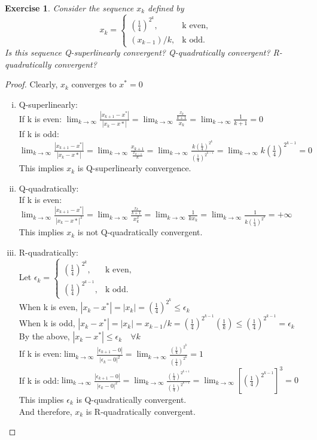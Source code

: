 \documentclass[11pt,a4paper]{article}
\renewcommand{\(}{\left(}
\renewcommand{\)}{\right)}
\newtheorem{exercise}{Exercise}
\begin{document}
  \setcounter{exercise}{15}
  
  \begin{exercise}
  Consider the sequence ${x_k}$ defined by
\[ x_k = \left\{
\begin{array}{ll}
\left( \frac{1}{4} \right)^{2^k}, & \mbox{k even}, \\
(x_{k-1})/k, & \mbox{k odd}.
\end{array} \right. \]
Is this sequence Q-superlinearly convergent? Q-quadratically convergent? R-quadratically convergent?	
  \end{exercise}  
  \begin{proof}
  Clearly, $x_k$ converges to $x^* = 0$
\begin{enumerate}[(i)]
\item Q-superlinearly:\\
If k is even: $\displaystyle \lim_{k \to \infty} \frac{|x_{k+1}-x^*|}{|x_k-x*|}=\lim_{k \to \infty} \frac{\frac{x_k}{k+1}}{x_k}=\lim_{k \to \infty} \frac{1}{k+1}=0$\\
If k is odd:$\displaystyle \lim_{k \to \infty} \frac{|x_{k+1}-x^*|}{|x_k-x*|}=\lim_{k \to \infty} \frac{x_{k+1}}{\frac{x_{k-1}}{k}}=\lim_{k \to \infty} \frac{k(\frac{1}{4})^{2^k}}{(\frac{1}{4})^{2^{k-1}}}=\lim_{k \to \infty} k(\frac{1}{4})^{2^{k-1}}=0$\\
This implies $x_k$ is Q-superlinearly convergence.
\item Q-quadratically:\\
If k is even:$\displaystyle \lim_{k \to \infty} \frac{|x_{k+1}-x^*|}{|x_k-x*|^2}=\lim_{k \to \infty} \frac{\frac{x_k}{k+1}}{x_k^2}=\lim_{k \to \infty} \frac{1}{kx_k}=\lim_{k \to \infty} \frac{1}{k(\frac{1}{4})^{2^k}}=+\infty$
This implies $x_k$ is not Q-quadratically convergent.
\item R-quadratically:\\
Let $\epsilon_k = \left\{
\begin{array}{ll}
\left( \frac{1}{4} \right)^{2^k}, & \mbox{k even}, \\
\left( \frac{1}{4} \right)^{2^{k-1}}, & \mbox{k odd}.
\end{array} \right.$\\
When k is even, $|x_k-x^*|=|x_k|=(\frac{1}{4})^{2^k} \leq \epsilon_k$\\
When k is odd, $|x_k-x^*|=|x_k|=x_{k-1}/k=(\frac{1}{4})^{2^{k-1}}(\frac{1}{k}) \leq (\frac{1}{4})^{2^{k-1}}=\epsilon_k$\\
By the above, $|x_k-x^*| \leq \epsilon_k \quad \forall k$\\
If k is even:$\displaystyle \lim_{k \to \infty} \frac{|\epsilon_{k+1}-0|}{|\epsilon_k-0|^2}=\lim_{k \to \infty} \frac{(\frac{1}{4})^{2^k}}{(\frac{1}{4})^{2^k}}=1$\\
If k is odd:$\displaystyle \lim_{k \to \infty} \frac{|\epsilon_{k+1}-0|}{|\epsilon_k-0|^2}=\lim_{k \to \infty} \frac{(\frac{1}{4})^{2^{k+1}}}{(\frac{1}{4})^{2^{k-1}}}=\lim_{k \to \infty}[(\frac{1}{4})^{2^{k-1}}]^3=0$\\
This implies $\epsilon_k$ is Q-quadratically convergent.\\
And therefore, $x_k$ is R-quadratically convergent.
\end{enumerate}	
  \end{proof}
  
  
\end{document}
